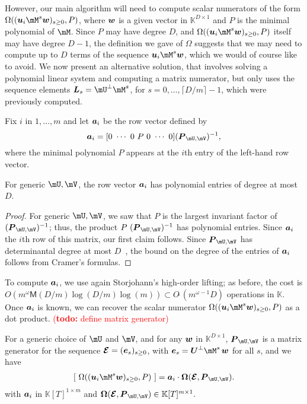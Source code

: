\documentclass[12pt]{article}
\newcommand{\var}{T} %
\newcommand{\mat}[1]{\bm{\MakeUppercase{#1}}} %
\newcommand{\row}[1]{\bm{\MakeLowercase{#1}}} %
\newcommand{\col}[1]{\bm{\MakeLowercase{#1}}} %
\newcommand{\softO}[1]{O{\tilde{~}}(#1)} %
\newcommand{\todo}[1]{\textcolor{red}{({\bf todo:} #1)}}
\newcommand{\minpoly}{P}
\def\M {\ensuremath{\mathsf{M}}}
\def\K{\mathbb{K}}
\def\K {\ensuremath{\mathbb{K}}}
\begin{document}
However, our main algorithm will need to compute scalar numerators of
the form \sloppy $\Omega((\row{u}_i \mM^s \col{w})_{s \ge 0},
\minpoly)$, where $\row{w}$ is a given vector in $\K^{D \times 1}$ and
$\minpoly$ is the minimal polynomial of $\mM$. Since $\minpoly$ may
have degree $D$, and $\Omega((\row{u}_i \mM^s \col{w})_{s \ge 0},
\minpoly)$ itself may have degree $D-1$,
the definition we gave of $\Omega$ suggests that we
may need to compute up to $D$ terms of the sequence $\row{u}_i \mM^s
\col{w}$, which we would of course like to avoid. We now present an
alternative solution, that involves solving a polynomial linear system
and computing a matrix numerator, but only uses the sequence elements
$\mat{L}_s= \mU^\perp \mM^s$, for $s=0,\dots,\lceil D/m \rceil-1$,
which were previously computed.

Fix $i$ in $1,\dots,m$ and let $\row{a}_i$ be the row vector defined
by $$\row{a}_i =[0~\cdots~0~\minpoly~0~\cdots~0]  (\mat{P}_{\mU,\mV})^{-1} ,$$
where the minimal polynomial $\minpoly$ appears at the $i$th entry  of the
left-hand row vector. 
\begin{lemma}\label{utilde}
  For generic $\mU,\mV$, the row vector $\row{a}_i$ has polynomial
  entries of degree at most~$D$.
\end{lemma}
\begin{proof}
  For generic $\mU,\mV$, we saw that $\minpoly$ is the largest
  invariant factor of $ (\mat{P}_{\mU,\mV})^{-1}$; thus, the product
  $\minpoly\ (\mat{P}_{\mU,\mV})^{-1}$ has polynomial entries. Since $\row{a}_i$ 
  the $i$th row of this matrix, our first claim follows. Since
  $\mat{P}_{\mU,\mV}$ has determinantal degree at most $D$~\cite{xxx}, the bound
  on the degree of the entries of $\row{a}_i$ follows from Cramer's
  formulas.
\end{proof}
To compute $\row{a}_i$, we use again Storjohann's high-order lifting;
as before, the cost is $O(m^{\omega} \M(D/m) \log(D/m) \log(m))
\subset \softO{m^{\omega-1}D}$ operations in $\K$.
Once $\row{a}_i$ is known, we can recover the scalar numerator
$\Omega((\row{u}_i \mM^s \col{w})_{s \ge 0}, \minpoly)$ as
a dot product. \todo{define matrix generator}
\begin{lemma}\label{lemma:omegaOmega}
  For a generic choice of $\mU$ and $\mV$, and for any $\col{w}$ in $\K^{D \times 1}$, $ \mat{P}_{\mU,\mV}$ is a matrix generator 
  for the sequence $\mat{\mathcal{E}} = (\col{e}_s)_{s\ge0}$, with
  $\col{e}_s=\mat{U}^\perp \mM^s\, \col{w}$ for all $s$,
  and we have 
\begin{align}\label{eq:OmegaOmega}
[~\Omega((\row{u}_i \mM^s \col{w})_{s \ge 0}, \minpoly)~] = \row{a}_i\cdot \mat{\Omega}(\mat{\mathcal{E}}, \mat{P}_{\mU,\mV}).
\end{align}
with $\row{a}_i$ in $\K[\var]^{1 \times m}$ and 
$\mat{\Omega}(\mat{\mathcal{E}} , \mat{P}_{\mU,\mV}) \in \K[\var]^{m \times 1}.$
\end{lemma}
\end{document}
